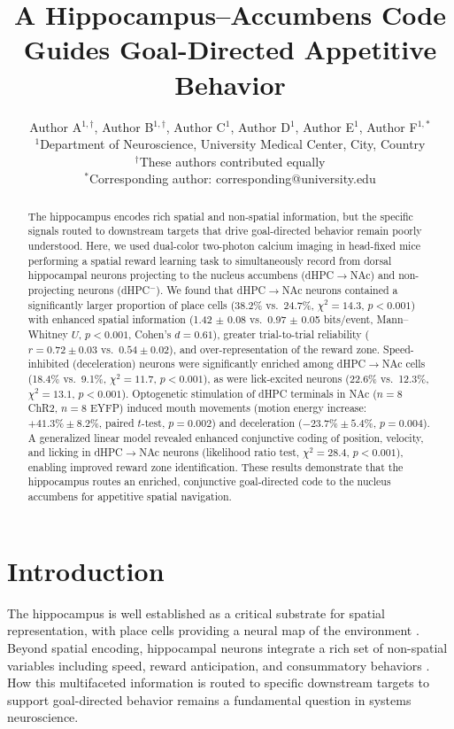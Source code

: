 \documentclass[11pt]{article}
\title{A Hippocampus--Accumbens Code Guides Goal-Directed Appetitive Behavior}
\author{%
  Author A$^{1,\dagger}$, Author B$^{1,\dagger}$, Author C$^{1}$, Author D$^{1}$, Author E$^{1}$, Author F$^{1,*}$\\[6pt]
  $^{1}$Department of Neuroscience, University Medical Center, City, Country\\
  $^{\dagger}$These authors contributed equally\\
  $^{*}$Corresponding author: corresponding@university.edu
}
\date{}
\begin{document}
\maketitle

\begin{abstract}
The hippocampus encodes rich spatial and non-spatial information, but the specific signals routed to downstream targets that drive goal-directed behavior remain poorly understood. Here, we used dual-color two-photon calcium imaging in head-fixed mice performing a spatial reward learning task to simultaneously record from dorsal hippocampal neurons projecting to the nucleus accumbens (dHPC$\to$NAc) and non-projecting neurons (dHPC$^{-}$). We found that dHPC$\to$NAc neurons contained a significantly larger proportion of place cells (38.2\% vs.\ 24.7\%, $\chi^2 = 14.3$, $p < 0.001$) with enhanced spatial information (1.42 $\pm$ 0.08 vs.\ 0.97 $\pm$ 0.05 bits/event, Mann--Whitney $U$, $p < 0.001$, Cohen's $d = 0.61$), greater trial-to-trial reliability ($r = 0.72 \pm 0.03$ vs.\ $0.54 \pm 0.02$), and over-representation of the reward zone. Speed-inhibited (deceleration) neurons were significantly enriched among dHPC$\to$NAc cells (18.4\% vs.\ 9.1\%, $\chi^2 = 11.7$, $p < 0.001$), as were lick-excited neurons (22.6\% vs.\ 12.3\%, $\chi^2 = 13.1$, $p < 0.001$). Optogenetic stimulation of dHPC terminals in NAc ($n = 8$ ChR2, $n = 8$ EYFP) induced mouth movements (motion energy increase: $+41.3\% \pm 8.2\%$, paired $t$-test, $p = 0.002$) and deceleration ($-23.7\% \pm 5.4\%$, $p = 0.004$). A generalized linear model revealed enhanced conjunctive coding of position, velocity, and licking in dHPC$\to$NAc neurons (likelihood ratio test, $\chi^2 = 28.4$, $p < 0.001$), enabling improved reward zone identification. These results demonstrate that the hippocampus routes an enriched, conjunctive goal-directed code to the nucleus accumbens for appetitive spatial navigation.
\end{abstract}

\section{Introduction}

The hippocampus is well established as a critical substrate for spatial representation, with place cells providing a neural map of the environment \citep{okeefe1971hippocampus, moser2008place}. Beyond spatial encoding, hippocampal neurons integrate a rich set of non-spatial variables including speed, reward anticipation, and consummatory behaviors \citep{mcnaughton1983contribution, gauthier2018dedicated, markus1995interactions}. How this multifaceted information is routed to specific downstream targets to support goal-directed behavior remains a fundamental question in systems neuroscience.
\end{document}
